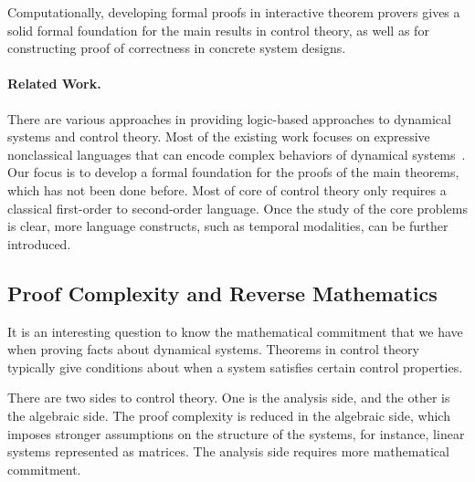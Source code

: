 \documentclass[10pt]{article}
\theoremstyle{definition}
\begin{document}
Computationally, developing formal proofs in interactive theorem provers gives a solid formal foundation for the main results in control theory, as well as for constructing proof of correctness in concrete system designs. 

\paragraph{Related Work. } There are various approaches in providing logic-based approaches to dynamical systems and control theory. Most of the existing work focuses on expressive nonclassical languages that can encode complex behaviors of dynamical systems~\cite{DBLP:conf/lics/Platzer12}. Our focus is to develop a formal foundation for the proofs of the main theorems, which has not been done before. Most of core of control theory only requires a classical first-order to second-order language. Once the study of the core problems is clear, more language constructs, such as temporal modalities, can be further introduced. 

\subsection{Proof Complexity and Reverse Mathematics} 

It is an interesting question to know the mathematical commitment that we have when proving facts about dynamical systems. Theorems in control theory typically give conditions about when a system satisfies certain control properties. 

There are two sides to control theory. One is the analysis side, and the other is the algebraic side. The proof complexity is reduced in the algebraic side, which imposes stronger assumptions on the structure of the systems, for instance, linear systems represented as matrices. The analysis side requires more mathematical commitment. 
\end{document}

